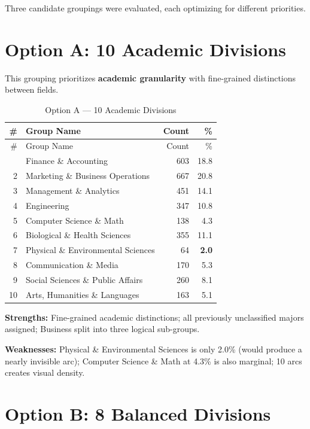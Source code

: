 \documentclass[
  11pt,
  letterpaper,
]{report}
\begin{document}
Three candidate groupings were evaluated, each optimizing for different
priorities.

\section{Option A: 10 Academic
Divisions}\label{option-a-10-academic-divisions}

This grouping prioritizes \textbf{academic granularity} with
fine-grained distinctions between fields.

\begin{longtable}[]{@{}rlrr@{}}
\caption{Option A --- 10 Academic
Divisions}\label{tbl-optionA}\tabularnewline
\toprule\noalign{}
\# & Group Name & Count & \% \\
\midrule\noalign{}
\endfirsthead
\toprule\noalign{}
\# & Group Name & Count & \% \\
\midrule\noalign{}
\endhead
\bottomrule\noalign{}
\endlastfoot
1 & Finance \& Accounting & 603 & 18.8 \\
2 & Marketing \& Business Operations & 667 & 20.8 \\
3 & Management \& Analytics & 451 & 14.1 \\
4 & Engineering & 347 & 10.8 \\
5 & Computer Science \& Math & 138 & 4.3 \\
6 & Biological \& Health Sciences & 355 & 11.1 \\
7 & Physical \& Environmental Sciences & 64 & \textbf{2.0} \\
8 & Communication \& Media & 170 & 5.3 \\
9 & Social Sciences \& Public Affairs & 260 & 8.1 \\
10 & Arts, Humanities \& Languages & 163 & 5.1 \\
\end{longtable}

\textbf{Strengths:} Fine-grained academic distinctions; all previously
unclassified majors assigned; Business split into three logical
sub-groups.

\textbf{Weaknesses:} Physical \& Environmental Sciences is only 2.0\%
(would produce a nearly invisible arc); Computer Science \& Math at
4.3\% is also marginal; 10 arcs creates visual density.

\section{Option B: 8 Balanced
Divisions}\label{option-b-8-balanced-divisions}
\end{document}
